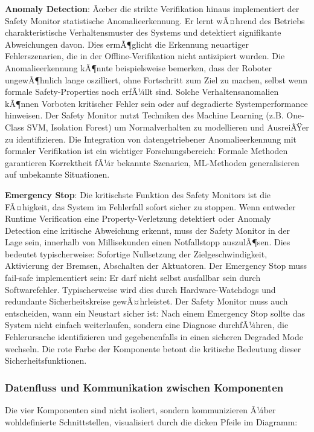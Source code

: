 ﻿\documentclass[a4paper,12pt]{article}
\theoremstyle{definition}
\begin{document}
\textbf{Anomaly Detection}: Ãœber die strikte Verifikation hinaus implementiert der Safety Monitor statistische Anomalieerkennung. Er lernt wÃ¤hrend des Betriebs charakteristische Verhaltensmuster des Systems und detektiert signifikante Abweichungen davon. Dies ermÃ¶glicht die Erkennung neuartiger Fehlerszenarien, die in der Offline-Verifikation nicht antizipiert wurden. Die Anomalieerkennung kÃ¶nnte beispielsweise bemerken, dass der Roboter ungewÃ¶hnlich lange oszilliert, ohne Fortschritt zum Ziel zu machen, selbst wenn formale Safety-Properties noch erfÃ¼llt sind. Solche Verhaltensanomalien kÃ¶nnen Vorboten kritischer Fehler sein oder auf degradierte Systemperformance hinweisen. Der Safety Monitor nutzt Techniken des Machine Learning (z.B. One-Class SVM, Isolation Forest) um Normalverhalten zu modellieren und AusreiÃŸer zu identifizieren. Die Integration von datengetriebener Anomalieerkennung mit formaler Verifikation ist ein wichtiger Forschungsbereich: Formale Methoden garantieren Korrektheit fÃ¼r bekannte Szenarien, ML-Methoden generalisieren auf unbekannte Situationen.

\textbf{Emergency Stop}: Die kritischste Funktion des Safety Monitors ist die FÃ¤higkeit, das System im Fehlerfall sofort sicher zu stoppen. Wenn entweder Runtime Verification eine Property-Verletzung detektiert oder Anomaly Detection eine kritische Abweichung erkennt, muss der Safety Monitor in der Lage sein, innerhalb von Millisekunden einen Notfallstopp auszulÃ¶sen. Dies bedeutet typischerweise: Sofortige Nullsetzung der Zielgeschwindigkeit, Aktivierung der Bremsen, Abschalten der Aktuatoren. Der Emergency Stop muss fail-safe implementiert sein: Er darf nicht selbst ausfallbar sein durch Softwarefehler. Typischerweise wird dies durch Hardware-Watchdogs und redundante Sicherheitskreise gewÃ¤hrleistet. Der Safety Monitor muss auch entscheiden, wann ein Neustart sicher ist: Nach einem Emergency Stop sollte das System nicht einfach weiterlaufen, sondern eine Diagnose durchfÃ¼hren, die Fehlerursache identifizieren und gegebenenfalls in einen sicheren Degraded Mode wechseln. Die rote Farbe der Komponente betont die kritische Bedeutung dieser Sicherheitsfunktionen.

\subsubsection{Datenfluss und Kommunikation zwischen Komponenten}

Die vier Komponenten sind nicht isoliert, sondern kommunizieren Ã¼ber wohldefinierte Schnittstellen, visualisiert durch die dicken Pfeile im Diagramm:
\end{document}
